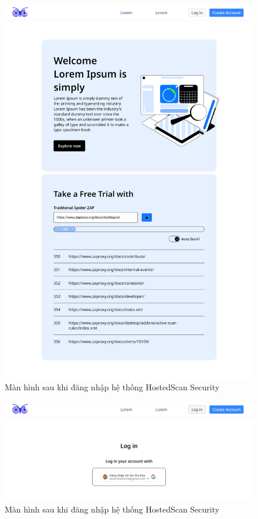 \begin{figure}[H]
    \centering
    \includegraphics[width=\textwidth]{images/prototype/prototype_22112022/home_scanning.png}
    \caption{Màn hình sau khi đăng nhập hệ thống HostedScan Security}
\end{figure}

\begin{figure}[H]
    \centering
\includegraphics[width=\textwidth]{images/prototype/prototype_22112022/login.png}
    \caption{Màn hình sau khi đăng nhập hệ thống HostedScan Security}
\end{figure}


